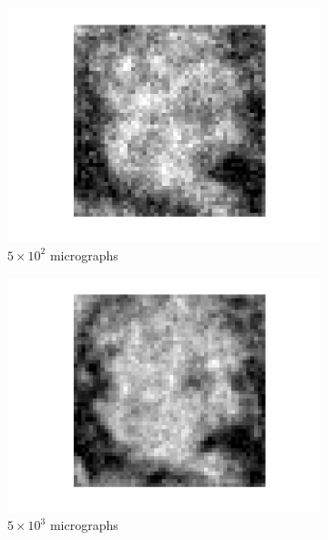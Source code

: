 \documentclass[9pt,twocolumn,twoside,lineno]{pnas-new}
\begin{document}
\begin{figure}[h]
	\centering
	\begin{subfigure}[h]{0.24\textwidth}
		\centering
		\includegraphics[scale=0.35]{Einstien_progress_1}
		\caption{$5\times 10^2$ micrographs}
	\end{subfigure} 
	\begin{subfigure}[h]{0.24\textwidth}
	\centering
	\includegraphics[scale=0.35]{Einstien_progress_10}
	\caption{$5\times 10^3$ micrographs}
\end{subfigure} 
	\begin{subfigure}[h]{0.24\textwidth}
		\centering

\end{subfigure}
\end{figure}
\end{document}
